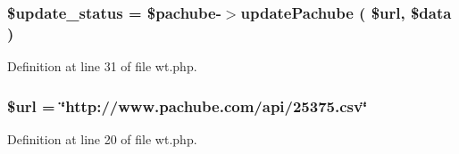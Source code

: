 \subsubsection[{\texorpdfstring{\$update\+\_\+status}{$update_status}}]{\setlength{\rightskip}{0pt plus 5cm}\$update\+\_\+status = \$pachube-\/$>$update\+Pachube ( \$url, \$data )}\hypertarget{wt_8php_ae9e1411ff46e859a40f8f1a7646430cf}{}\label{wt_8php_ae9e1411ff46e859a40f8f1a7646430cf}


Definition at line 31 of file wt.\+php.

\subsubsection[{\texorpdfstring{\$url}{$url}}]{\setlength{\rightskip}{0pt plus 5cm}\$url = \char`\"{}http\+://www.\+pachube.\+com/api/25375.csv\char`\"{}}\hypertarget{wt_8php_acf215f34a917d014776ce684a9ee8909}{}\label{wt_8php_acf215f34a917d014776ce684a9ee8909}


Definition at line 20 of file wt.\+php.

